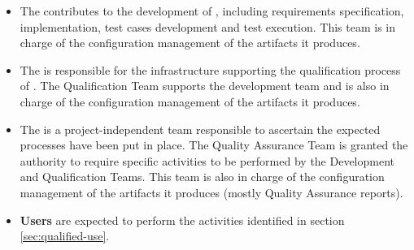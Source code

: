 \begin{itemize}
\item%
  The  contributes to the development of \xcov{},
  including requirements specification, implementation, test cases development
  and test execution.
  This team is in charge of the configuration management of the artifacts it
  produces.
\item%
  The  is responsible for the infrastructure
  supporting the qualification process of \xcov{}.
  The Qualification Team supports the development team and is also in charge
  of the configuration management of the artifacts it produces.
\item%
  The  is a project-independent team
  responsible to ascertain the expected processes have been put in place.
  The Quality Assurance Team is granted the authority to require specific
  activities to be performed by the \xcov{} Development and Qualification
  Teams.
  This team is also in charge of the configuration management of the
  artifacts it produces (mostly Quality Assurance reports).
\item \textbf{\xcov{} Users} are expected to perform the activities identified
  in section \ref{sec:qualified-use}.
\end{itemize}
